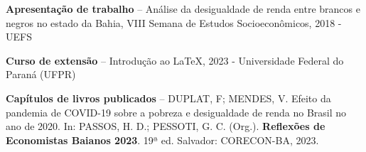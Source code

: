 \documentclass[10pt,a4paper]{cv}
\begin{document}


\divider


\divider





\textbf{Apresentação de trabalho} -- Análise da desigualdade de renda entre brancos e negros no estado da Bahia, VIII Semana de Estudos Socioeconômicos, 2018 - UEFS

\textbf{Curso de extensão} -- Introdução ao \LaTeX{}, 2023 - Universidade Federal do Paraná (UFPR)

\textbf{Capítulos de livros publicados} -- DUPLAT, F; MENDES, V. Efeito da pandemia de COVID-19 sobre a pobreza e desigualdade de renda no Brasil no ano de 2020. In: PASSOS, H. D.; PESSOTI, G. C. (Org.). \textbf{Reflexões de Economistas Baianos 2023}. 19ª ed. Salvador: CORECON-BA, 2023.








\end{document}
